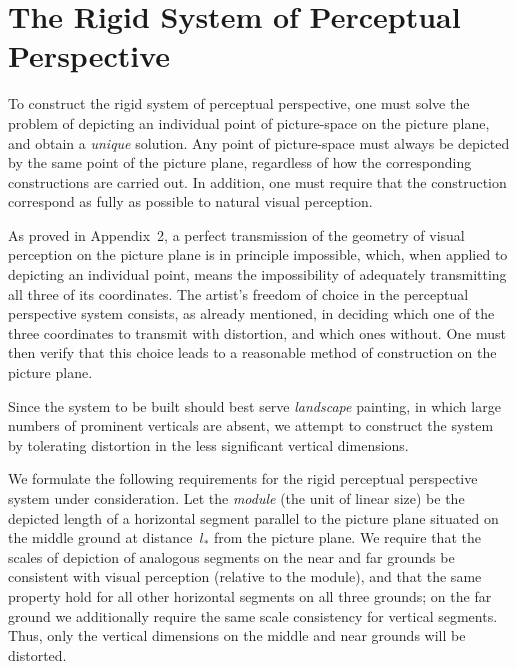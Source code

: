
\chapter{The Rigid System of Perceptual Perspective}


To construct the rigid system of perceptual perspective, one must solve the problem of
depicting an individual point of picture-space on the picture plane, and obtain a
\emph{unique} solution.  Any point of picture-space must always be depicted by the same
point of the picture plane, regardless of how the corresponding constructions are carried
out.  In addition, one must require that the construction correspond as fully as possible
to natural visual perception.

As proved in Appendix~2, a perfect transmission of the geometry of visual perception on
the picture plane is in principle impossible, which, when applied to depicting an
individual point, means the impossibility of adequately transmitting all three of its
coordinates.  The artist's freedom of choice in the perceptual perspective system
consists, as already mentioned, in deciding which one of the three coordinates to transmit
with distortion, and which ones without.  One must then verify that this choice leads to a
reasonable method of construction on the picture plane.

Since the system to be built should best serve \emph{landscape} painting, in which large
numbers of prominent verticals are absent, we attempt to construct the system by tolerating
distortion in the less significant vertical dimensions.


We formulate the following requirements for the rigid perceptual perspective system under
consideration.  Let the \emph{module} (the unit of linear size) be the depicted length of
a horizontal segment parallel to the picture plane situated on the middle ground at
distance~$l_*$ from the picture plane.  We require that the scales of depiction of
analogous segments on the near and far grounds be consistent with visual perception (relative
to the module), and that the same property hold for all other horizontal segments on all
three grounds; on the far ground we additionally require the same scale consistency for
vertical segments.  Thus, only the vertical dimensions on the middle and near grounds will
be distorted.

